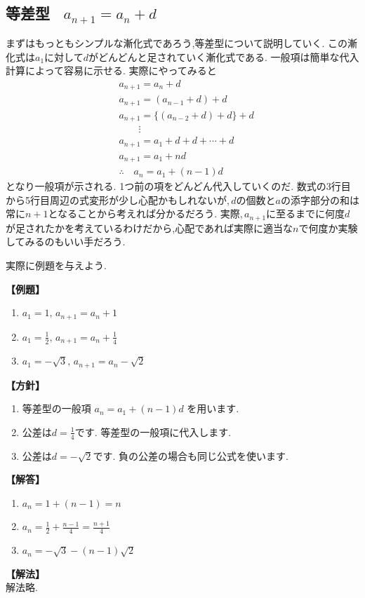 
  \subsection{等差型 \, $a_{n+1}=a_n+d$}
    まずはもっともシンプルな漸化式であろう,等差型について説明していく.
    この漸化式は$a_1$に対して$d$がどんどんと足されていく漸化式である.
    一般項は簡単な代入計算によって容易に示せる.
    実際にやってみると
    \begin{align*}
      &a_{n+1}=a_n+d\\
      &a_{n+1}=(a_{n-1}+d)+d\\
      &a_{n+1}=\{(a_{n-2}+d)+d\}+d\\
      &\qquad \vdots\\
      &a_{n+1}=a_1+d+d+\cdots+d\\
      &a_{n+1}=a_1+nd\\
      &\therefore \quad a_n=a_1+(n-1)d
    \end{align*}
    となり一般項が示される.
    1つ前の項をどんどん代入していくのだ.
    数式の3行目から5行目周辺の式変形が少し心配かもしれないが,\,$d$の個数と$a$の添字部分の和は常に$n+1$となることから考えれば分かるだろう.
    実際,\,$a_{n+1}$に至るまでに何度$d$が足されたかを考えているわけだから,心配であれば実際に適当な$n$で何度か実験してみるのもいい手だろう.

    実際に例題を与えよう.

    \noindent \textbf{【例題】}
    \begin{enumerate}[label=(\arabic*),parsep=3pt]
      \item $\displaystyle a_1=1,\, a_{n+1}=a_n+1$
      \item $\displaystyle a_1=\frac{1}{2},\, a_{n+1}=a_n+\frac{1}{4}$
      \item $\displaystyle a_1=-\sqrt{3},\, a_{n+1}=a_n-\sqrt{2}$
    \end{enumerate}

    \noindent\textbf{【方針】}
    \begin{enumerate}[label=(\arabic*),parsep=3pt]
      \item 等差型の一般項
            $\displaystyle a_n=a_1+(n-1)d$
            を用います.
      \item 公差は$\displaystyle d=\frac14$です.
            等差型の一般項に代入します.
      \item 公差は$\displaystyle d=-\sqrt2$です.
            負の公差の場合も同じ公式を使います.
    \end{enumerate}

    \noindent\textbf{【解答】}
    \begin{enumerate}[label=(\arabic*),parsep=3pt]
      \item $\displaystyle a_n=1+(n-1)=n$
      \item $\displaystyle a_n=\frac12+\frac{n-1}{4}
            =\frac{n+1}{4}$
      \item $\displaystyle a_n=-\sqrt3-(n-1)\sqrt2$
    \end{enumerate}

    \noindent\textbf{【解法】}\\
    解法略.
